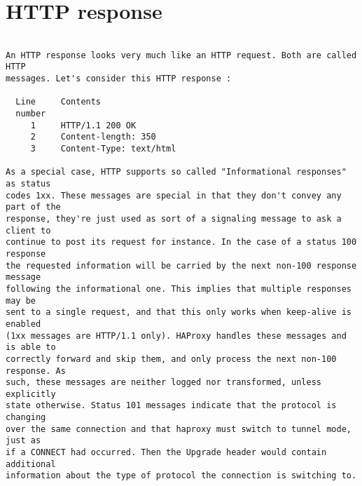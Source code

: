 
\section{HTTP response}

\begin{verbatim}

An HTTP response looks very much like an HTTP request. Both are called HTTP
messages. Let's consider this HTTP response :

  Line     Contents
  number
     1     HTTP/1.1 200 OK
     2     Content-length: 350
     3     Content-Type: text/html

As a special case, HTTP supports so called "Informational responses" as status
codes 1xx. These messages are special in that they don't convey any part of the
response, they're just used as sort of a signaling message to ask a client to
continue to post its request for instance. In the case of a status 100 response
the requested information will be carried by the next non-100 response message
following the informational one. This implies that multiple responses may be
sent to a single request, and that this only works when keep-alive is enabled
(1xx messages are HTTP/1.1 only). HAProxy handles these messages and is able to
correctly forward and skip them, and only process the next non-100 response. As
such, these messages are neither logged nor transformed, unless explicitly
state otherwise. Status 101 messages indicate that the protocol is changing
over the same connection and that haproxy must switch to tunnel mode, just as
if a CONNECT had occurred. Then the Upgrade header would contain additional
information about the type of protocol the connection is switching to.


\end{verbatim}

